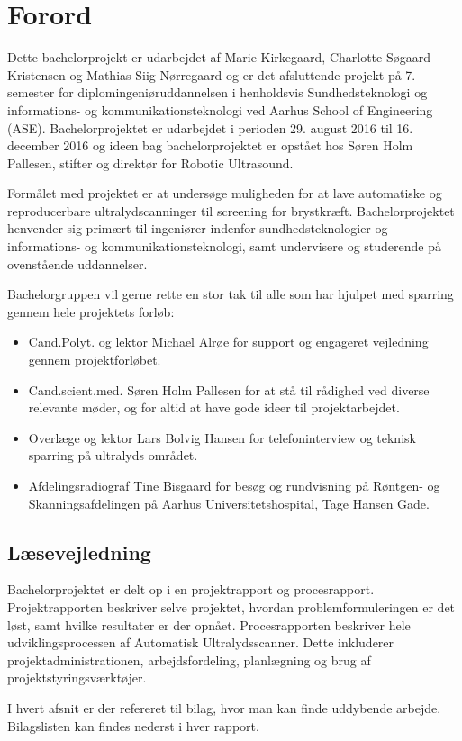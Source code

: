 \chapter{Forord}
Dette bachelorprojekt er udarbejdet af Marie Kirkegaard, Charlotte Søgaard Kristensen og Mathias Siig Nørregaard og er det afsluttende projekt på 7. semester for diplomingeniøruddannelsen i henholdsvis Sundhedsteknologi og informations- og kommunikationsteknologi ved Aarhus School of Engineering (ASE). Bachelorprojektet er udarbejdet i perioden 29. august 2016 til 16. december 2016 og ideen bag bachelorprojektet er opstået hos Søren Holm Pallesen, stifter og direktør for Robotic Ultrasound. 

Formålet med projektet er at undersøge muligheden for at lave automatiske og reproducerbare ultralydscanninger til screening for brystkræft. Bachelorprojektet henvender sig primært til ingeniører indenfor sundhedsteknologier og informations- og  kommunikationsteknologi, samt undervisere og studerende på ovenstående uddannelser. 

Bachelorgruppen vil gerne rette en stor tak til alle som har hjulpet med sparring gennem hele projektets forløb:

\begin{itemize}
\item Cand.Polyt. og lektor Michael Alrøe for support og engageret vejledning gennem projektforløbet.

\item Cand.scient.med. Søren Holm Pallesen for at stå til rådighed ved diverse relevante
møder, og for altid at have gode ideer til projektarbejdet.

\item Overlæge og lektor Lars Bolvig Hansen for telefoninterview og teknisk sparring på ultralyds området.

\item Afdelingsradiograf Tine Bisgaard for besøg og rundvisning på Røntgen- og Skanningsafdelingen på Aarhus Universitetshospital, Tage Hansen Gade. 
\end{itemize}

\section{Læsevejledning} 
Bachelorprojektet er delt op i en projektrapport og procesrapport. Projektrapporten beskriver selve projektet, hvordan problemformuleringen er det løst, samt hvilke resultater er der opnået. Procesrapporten beskriver hele udviklingsprocessen af Automatisk Ultralydsscanner. Dette inkluderer projektadministrationen, arbejdsfordeling, planlægning og brug af projektstyringsværktøjer. 

I hvert afsnit er der refereret til bilag, hvor man kan finde uddybende arbejde. Bilagslisten kan findes nederst i hver rapport.  

